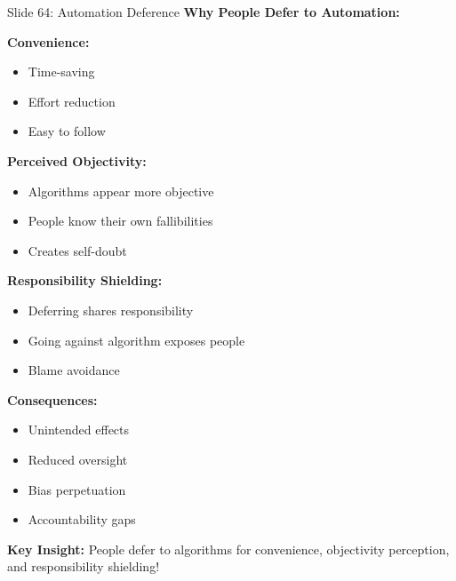 \documentclass[8pt]{beamer}
\begin{document}
	\begin{frame}{Slide 64: Automation Deference}
		\fontsize{6.5}{7.5}\selectfont
		\textbf{Why People Defer to Automation:}
		
		\vspace{0.1cm}
		\textbf{Convenience:}
		\begin{itemize}
			\item Time-saving
			\item Effort reduction
			\item Easy to follow
		\end{itemize}
		
		\vspace{0.1cm}
		\textbf{Perceived Objectivity:}
		\begin{itemize}
			\item Algorithms appear more objective
			\item People know their own fallibilities
			\item Creates self-doubt
		\end{itemize}
		
		\vspace{0.1cm}
		\textbf{Responsibility Shielding:}
		\begin{itemize}
			\item Deferring shares responsibility
			\item Going against algorithm exposes people
			\item Blame avoidance
		\end{itemize}
		
		\vspace{0.1cm}
		\textbf{Consequences:}
		\begin{itemize}
			\item Unintended effects
			\item Reduced oversight
			\item Bias perpetuation
			\item Accountability gaps
		\end{itemize}
		
		\textcolor{myblue}{\textbf{Key Insight:}} People defer to algorithms for \textcolor{myblue}{convenience, objectivity perception, and responsibility shielding}!
	\end{frame}
	
\end{document}
